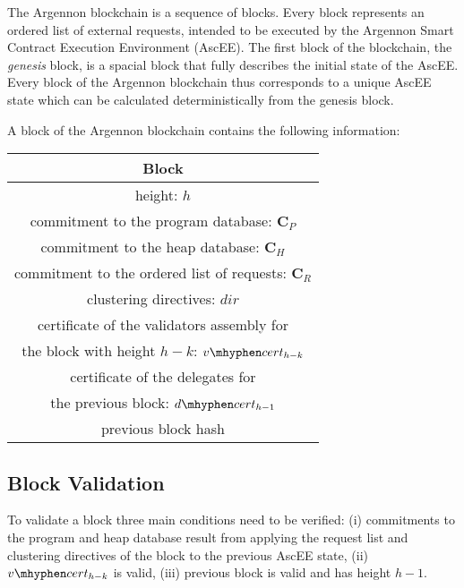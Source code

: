 
The Argennon blockchain is a sequence of blocks. Every block represents an ordered list of external requests, intended
to be executed by the Argennon Smart Contract Execution Environment (AscEE). The first block of the blockchain, the
\emph{genesis} block, is a spacial block that fully describes the initial state of the AscEE. Every block of the
Argennon blockchain thus corresponds to a unique AscEE state which can be calculated deterministically from the genesis
block.

A block of the Argennon blockchain contains the following information:

\begin{center}
    \begin{tabular}{||c||}
        \hline
        \textbf{Block} \\ [0.6ex]
        \hline\hline
        height: $h$                          \\ [1.2ex]
        commitment to the program database: $\mathbf{C}_{P}$             \\ [1.2ex]
        commitment to the heap database: $\mathbf{C}_{H}$               \\ [1.2ex]
        commitment to the ordered list of requests: $\mathbf{C}_{R}$        \\ [1.2ex]
        clustering directives: $dir$                        \\ [1.2ex]
        certificate of the validators assembly for \\
        the block with height $h - k$: $v \mhyphen cert_{h-k}$         \\ [1.2ex]
        certificate of the delegates for\\
        the previous block: $d \mhyphen cert_{h-1}$        \\ [1.2ex]
        previous block hash                           \\ [1.2ex]
        \hline
    \end{tabular}
\end{center}

\subsection{Block Validation}\label{subsec:block-validation}

To validate a block three main conditions need to be verified: (i) commitments to the program and heap
database result from applying the request list and clustering directives of the block to the previous AscEE
state, (ii) $v \mhyphen cert_{h-k}$ is valid, (iii) previous block is valid and has height $h - 1$.

